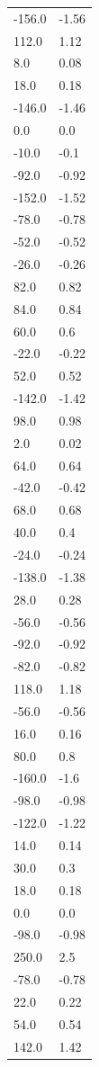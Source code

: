 \begin{longtable}{ll}
-156.0 & -1.56 \\
112.0 & 1.12 \\
8.0 & 0.08 \\
18.0 & 0.18 \\
-146.0 & -1.46 \\
0.0 & 0.0 \\
-10.0 & -0.1 \\
-92.0 & -0.92 \\
-152.0 & -1.52 \\
-78.0 & -0.78 \\
-52.0 & -0.52 \\
-26.0 & -0.26 \\
82.0 & 0.82 \\
84.0 & 0.84 \\
60.0 & 0.6 \\
-22.0 & -0.22 \\
52.0 & 0.52 \\
-142.0 & -1.42 \\
98.0 & 0.98 \\
2.0 & 0.02 \\
64.0 & 0.64 \\
-42.0 & -0.42 \\
68.0 & 0.68 \\
40.0 & 0.4 \\
-24.0 & -0.24 \\
-138.0 & -1.38 \\
28.0 & 0.28 \\
-56.0 & -0.56 \\
-92.0 & -0.92 \\
-82.0 & -0.82 \\
118.0 & 1.18 \\
-56.0 & -0.56 \\
16.0 & 0.16 \\
80.0 & 0.8 \\
-160.0 & -1.6 \\
-98.0 & -0.98 \\
-122.0 & -1.22 \\
14.0 & 0.14 \\
30.0 & 0.3 \\
18.0 & 0.18 \\
0.0 & 0.0 \\
-98.0 & -0.98 \\
250.0 & 2.5 \\
-78.0 & -0.78 \\
22.0 & 0.22 \\
54.0 & 0.54 \\
142.0 & 1.42 \\

\end{longtable}
